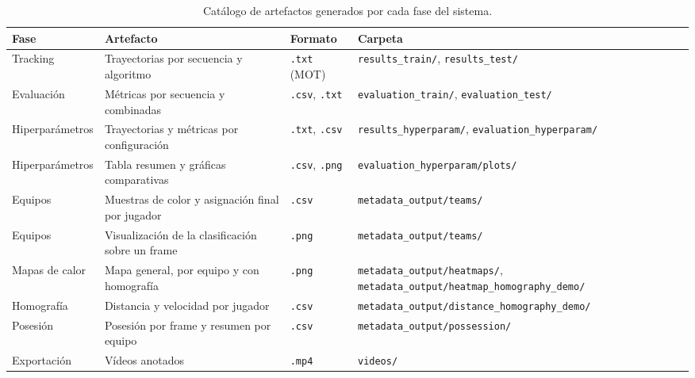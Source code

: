 \begin{table}[htp]
\centering
\caption{Catálogo de artefactos generados por cada fase del sistema.}
\label{tab:diseno-artefactos}
\renewcommand{\arraystretch}{1.2}
\small
\begin{tabular}{|p{2.9cm}|p{3.8cm}|p{1.5cm}|p{3.9cm}|}
\hline
\rowcolor{gray!25}
\textbf{Fase} & \textbf{Artefacto} & \textbf{Formato} & \textbf{Carpeta} \\
\hline
Tracking & Trayectorias por secuencia y algoritmo & \texttt{.txt} (MOT) &
  \texttt{results\_\allowbreak train/}, \texttt{results\_\allowbreak test/} \\
\hline
Evaluación & Métricas por secuencia y combinadas & \texttt{.csv},
  \texttt{.txt} & \texttt{evaluation\_\allowbreak train/}, \texttt{evaluation\_\allowbreak test/} \\
\hline
Hiperparámetros & Trayectorias y métricas por configuración & \texttt{.txt},
  \texttt{.csv} & \texttt{results\_\allowbreak hyperparam/},
  \texttt{evaluation\_\allowbreak hyperparam/} \\
\hline
Hiperparámetros & Tabla resumen y gráficas comparativas & \texttt{.csv},
  \texttt{.png} & \texttt{evaluation\_\allowbreak hyperparam/\allowbreak plots/} \\
\hline
Equipos & Muestras de color y asignación final por jugador & \texttt{.csv} &
  \texttt{metadata\_\allowbreak output/teams/} \\
\hline
Equipos & Visualización de la clasificación sobre un frame & \texttt{.png} &
  \texttt{metadata\_\allowbreak output/teams/} \\
\hline
Mapas de calor & Mapa general, por equipo y con homografía & \texttt{.png} &
  \texttt{metadata\_\allowbreak output/heatmaps/},
  \texttt{metadata\_\allowbreak output/\allowbreak heatmap\_\allowbreak homography\_\allowbreak demo/} \\
\hline
Homografía & Distancia y velocidad por jugador & \texttt{.csv} &
  \texttt{metadata\_\allowbreak output/\allowbreak distance\_\allowbreak homography\_\allowbreak demo/} \\
\hline
Posesión & Posesión por frame y resumen por equipo & \texttt{.csv} &
  \texttt{metadata\_\allowbreak output/\allowbreak possession/} \\
\hline
Exportación & Vídeos anotados & \texttt{.mp4} & \texttt{videos/} \\
\hline
\end{tabular}
\end{table}

